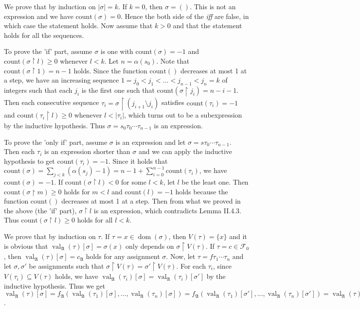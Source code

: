 \documentclass[12pt]{article}
\newcommand{\dom}{\mathop{\mathrm{dom}}}
\newcommand{\val}{\mathop{\mathrm{val}}}
\theoremstyle{definition}
\newenvironment{customthm}[1]
  {\renewcommand\theinnercustomthm{#1}\innercustomthm}
  {\endinnercustomthm}
\begin{document}
\begin{customthm}{II.4.7} We prove that by induction on $|\sigma|=k$. If $k=0$, then $\sigma=()$. This is not an expression and we have $\mathrm{count}(\sigma)=0$. Hence the both side of the \textit{iff} are false, in which case the statement holds. Now assume that $k>0$ and that the statement holds for all the sequences.

To prove the 'if' part, assume $\sigma$ is one with $\mathrm{count}(\sigma)=-1$ and $\mathrm{count}(\sigma\upharpoonright l)\geq0$ whenever $l<k$. Let $n=\alpha(s_0)$. Note that $\mathrm{count}(\sigma\upharpoonright1)=n-1$ holds. Since the function $\mathrm{count}()$ decreases at most 1 at a step, we have an increasing sequence $1=j_0<j_1<\ldots<j_{n-1}<j_n=k$ of integers such that each $j_i$ is the first one such that $\mathrm{count}(\sigma\upharpoonright j_i)=n-i-1$. Then each consecutive sequence $\tau_i=\sigma\upharpoonright(j_{i+1}\setminus j_i)$ satisfies $\mathrm{count}(\tau_i)=-1$ and $\mathrm{count}(\tau_i\upharpoonright l)\geq0$ whenever $l<|\tau_i|$, which turns out to be a subexpression by the inductive hypothesis. Thus $\sigma=s_0\tau_0\cdots\tau_{n-1}$ is an expression.

To prove the 'only if' part, assume $\sigma$ is an expression and let $\sigma=s\tau_0\cdots\tau_{n-1}$. Then each $\tau_i$ is an expression shorter than $\sigma$ and we can apply the inductive hypothesis to get $\mathrm{count}(\tau_i)=-1$. Since it holds that $\mathrm{count}(\sigma)=\sum_{j<k}(\alpha(s_j)-1)=n-1+\sum_{i=0}^{n-1}\mathrm{count}(\tau_i)$, we have $\mathrm{count}(\sigma)=-1$. If $\mathrm{count}(\sigma\upharpoonright l)<0$ for some $l<k$, let $l$ be the least one. Then $\mathrm{count}(\sigma\upharpoonright m)\geq0$ holds for $m<l$ and $\mathrm{count}(l)=-1$ holds because the function $\mathrm{count}()$ decreases at most 1 at a step. Then from what we proved in the above (the 'if' part), $\sigma\upharpoonright l$ is an expression, which contradicts Lemma II.4.3. Thus $\mathrm{count}(\sigma\upharpoonright l)\geq0$ holds for all $l<k$.
\end{customthm}

\begin{customthm}{II.7.5} We prove that by induction on $\tau$. If $\tau=x\in\dom(\sigma)$, then $V(\tau)=\{x\}$ and it is obvious that $\val_\mathfrak{A}(\tau)[\sigma]=\sigma(x)$ only depends on $\sigma\upharpoonright V(\tau)$. If $\tau=c\in\mathcal{F}_0$, then $\val_\mathfrak{A}(\tau)[\sigma]=c_\mathfrak{A}$ holds for any assignment $\sigma$. Now, let $\tau=f\tau_1\cdots\tau_n$ and let $\sigma,\sigma'$ be assignments such that $\sigma\upharpoonright V(\tau)=\sigma'\upharpoonright V(\tau)$. For each $\tau_i$, since $V(\tau_i)\subseteq V(\tau)$ holds, we have $\val_\mathfrak{A}(\tau_i)[\sigma]=\val_\mathfrak{A}(\tau_i)[\sigma']$ by the inductive hypothesis. Thus we get $\val_\mathfrak{A}(\tau)[\sigma]=f_\mathfrak{A}(\val_\mathfrak{A}(\tau_1)[\sigma],\ldots,\val_\mathfrak{A}(\tau_n)[\sigma])=f_\mathfrak{A}(\val_\mathfrak{A}(\tau_1)[\sigma'],\ldots,\val_\mathfrak{A}(\tau_n)[\sigma'])=\val_\mathfrak{A}(\tau)[\sigma']$.
\end{customthm}
\end{document}
